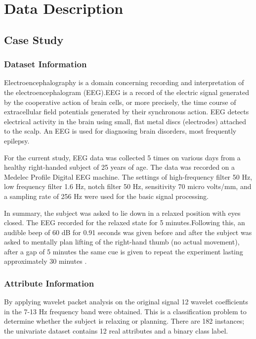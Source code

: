 \documentclass{cmppgr}
\begin{document}
 


\section{Data Description}


\subsection{Case Study}
\subsubsection{Dataset Information}
Electroencephalography is a domain concerning recording and interpretation of the electroencephalogram (EEG).EEG is a record of the electric signal generated by the cooperative action of brain cells, or more precisely, the time course of extracellular field potentials generated by their synchronous action\cite{lindsley1950emotions}. EEG detects electrical activity in the brain using small, flat metal discs (electrodes) attached to the scalp. An EEG is used for diagnosing brain disorders, most frequently epilepsy. 



For the current study, EEG data was collected 5 times on various days from a healthy right-handed subject of 25 years of age. The data was recorded on a Medelec Profile Digital EEG machine. The settings of high-frequency filter 50 Hz, low frequency filter 1.6 Hz, notch filter 50 Hz, sensitivity 70 micro volts/mm, and a sampling rate of 256 Hz were used for the basic signal processing. 

In summary, the subject was asked to lie down in a relaxed position with eyes closed. The EEG recorded for the relaxed state for 5 minutes.Following this, an audible beep of 60 dB for 0.91 seconds was given before and after the subject was asked to mentally plan lifting of the right-hand thumb (no actual movement), after a gap of 5 minutes the same cue is given to repeat the experiment lasting approximately 30 minutes \cite{planning_relax_data_set}.

\subsubsection{Attribute Information}
By applying wavelet packet analysis on the original signal 12 wavelet coefficients in the 7-13 Hz frequency band were obtained. This is a classification problem to determine whether the subject is relaxing or planning. There are 182 instances; the univariate dataset contains 12 real attributes and a binary class label.
 
\end{document}
